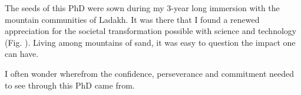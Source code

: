 %
\label{sec:acknowledgement}

The seeds of this PhD were sown during my 3-year long immersion with the mountain communities of Ladakh. It was
there that I found a renewed appreciation for the societal transformation possible with science and technology
(Fig. ). Living among mountains of sand, it was easy to question the impact one can have. 

I often wonder wherefrom the confidence, perseverance and commitment needed to see through this PhD came from. 







